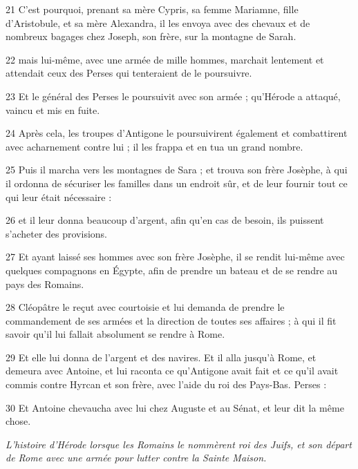\par 21 C'est pourquoi, prenant sa mère Cypris, sa femme Mariamne, fille d'Aristobule, et sa mère Alexandra, il les envoya avec des chevaux et de nombreux bagages chez Joseph, son frère, sur la montagne de Sarah.

\par 22 mais lui-même, avec une armée de mille hommes, marchait lentement et attendait ceux des Perses qui tenteraient de le poursuivre.

\par 23 Et le général des Perses le poursuivit avec son armée ; qu'Hérode a attaqué, vaincu et mis en fuite.

\par 24 Après cela, les troupes d'Antigone le poursuivirent également et combattirent avec acharnement contre lui ; il les frappa et en tua un grand nombre.

\par 25 Puis il marcha vers les montagnes de Sara ; et trouva son frère Josèphe, à qui il ordonna de sécuriser les familles dans un endroit sûr, et de leur fournir tout ce qui leur était nécessaire :

\par 26 et il leur donna beaucoup d'argent, afin qu'en cas de besoin, ils puissent s'acheter des provisions.

\par 27 Et ayant laissé ses hommes avec son frère Josèphe, il se rendit lui-même avec quelques compagnons en Égypte, afin de prendre un bateau et de se rendre au pays des Romains.

\par 28 Cléopâtre le reçut avec courtoisie et lui demanda de prendre le commandement de ses armées et la direction de toutes ses affaires ; à qui il fit savoir qu'il lui fallait absolument se rendre à Rome.

\par 29 Et elle lui donna de l'argent et des navires. Et il alla jusqu'à Rome, et demeura avec Antoine, et lui raconta ce qu'Antigone avait fait et ce qu'il avait commis contre Hyrcan et son frère, avec l'aide du roi des Pays-Bas. Perses :

\par 30 Et Antoine chevaucha avec lui chez Auguste et au Sénat, et leur dit la même chose.


\par \textit{L'histoire d'Hérode lorsque les Romains le nommèrent roi des Juifs, et son départ de Rome avec une armée pour lutter contre la Sainte Maison.}

